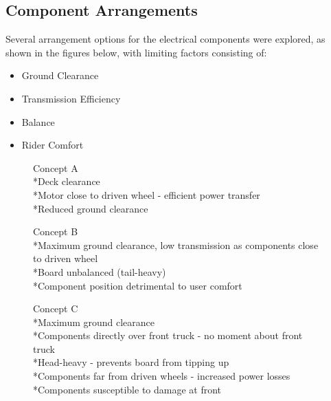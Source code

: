 \documentclass[journal,10pt]{IEEEtran}
\begin{document}
    \subsection{Component Arrangements}
        Several arrangement options for the electrical components were explored, as shown in the figures below, with limiting factors consisting of:
        \begin{itemize}
            	\item Ground Clearance
            	\item Transmission Efficiency
            	\item Balance 
            	\item Rider Comfort
            \end{itemize}
        \begin{figure}[H]
                \centering
                \caption{
                Concept A
                \\*Deck clearance
                \\*Motor close to driven wheel - efficient power transfer
                \\*Reduced ground clearance}
                \label{fig:ConceptA}
            \end{figure} 
        \begin{figure}[H]
                \centering
                \caption{Concept B
                \\*Maximum ground clearance, low transmission as components close to driven wheel
                \\*Board unbalanced (tail-heavy)
                \\*Component position detrimental to user comfort}
                \label{fig:ConceptB}
            \end{figure}  
        \begin{figure}[H]
                \centering
                \caption{Concept C
                \\*Maximum ground clearance
                \\*Components directly over front truck - no moment about front truck
                \\*Head-heavy - prevents board from tipping up
                \\*Components far from driven wheels - increased power losses
                \\*Components susceptible to damage at front}
                \label{fig:ConceptC}
            \end{figure} 
\end{document}
